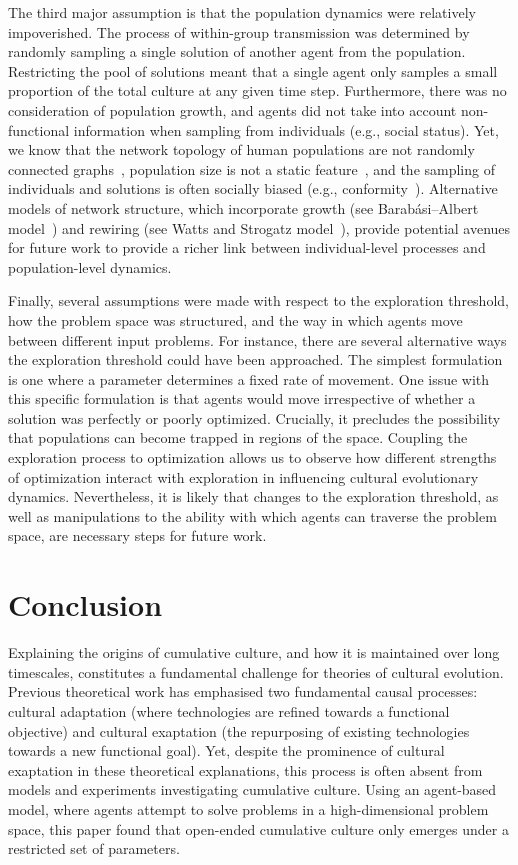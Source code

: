 \documentclass{article}
\begin{document}
The third major assumption is that the population dynamics were relatively impoverished. The process of within-group transmission was determined by randomly sampling a single solution of another agent from the population. Restricting the pool of solutions meant that a single agent only samples a small proportion of the total culture at any given time step. Furthermore, there was no consideration of population growth, and agents did not take into account non-functional information when sampling from individuals (e.g., social status). Yet, we know that the network topology of human populations are not randomly connected graphs~\cite{albert2002statistical}, population size is not a static feature~\cite{creanza2017greater}, and the sampling of individuals and solutions is often socially biased (e.g., conformity~\cite{richerson_not_2008}). Alternative models of network structure, which incorporate growth (see Barab\'asi–Albert model~\cite{barabasi1999emergence}) and rewiring (see Watts and Strogatz model~\cite{watts1998collective}), provide potential avenues for future work to provide a richer link between individual-level processes and population-level dynamics.

Finally, several assumptions were made with respect to the exploration threshold, how the problem space was structured, and the way in which agents move between different input problems. For instance, there are several alternative ways the exploration threshold could have been approached. The simplest formulation is one where a parameter determines a fixed rate of movement. One issue with this specific formulation is that agents would move irrespective of whether a solution was perfectly or poorly optimized. Crucially, it precludes the possibility that populations can become trapped in regions of the space. Coupling the exploration process to optimization allows us to observe how different strengths of optimization interact with exploration in influencing cultural evolutionary dynamics. Nevertheless, it is likely that changes to the exploration threshold, as well as manipulations to the ability with which agents can traverse the problem space, are necessary steps for future work. 

\section{Conclusion}
Explaining the origins of cumulative culture, and how it is maintained over long timescales, constitutes a fundamental challenge for theories of cultural evolution. Previous theoretical work has emphasised two fundamental causal processes: cultural adaptation (where technologies are refined towards a functional objective) and cultural exaptation (the repurposing of existing technologies towards a new functional goal). Yet, despite the prominence of cultural exaptation in these theoretical explanations, this process is often absent from models and experiments investigating cumulative culture. Using an agent-based model, where agents attempt to solve problems in a high-dimensional problem space, this paper found that open-ended cumulative culture only emerges under a restricted set of parameters.
\end{document}
